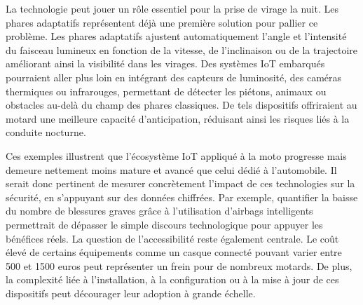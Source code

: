\vspace{0.5cm}
La technologie peut jouer un rôle essentiel pour la prise de virage la nuit. Les phares adaptatifs représentent déjà une première solution pour pallier ce problème. Les phares adaptatifs ajustent automatiquement l’angle et l’intensité du faisceau lumineux en fonction de la vitesse, de l’inclinaison ou de la trajectoire améliorant ainsi la visibilité dans les virages. Des systèmes IoT embarqués pourraient aller plus loin en intégrant des capteurs de luminosité, des caméras thermiques ou infrarouges, permettant de détecter les piétons, animaux ou obstacles au-delà du champ des phares classiques. De tels dispositifs offriraient au motard une meilleure capacité d’anticipation, réduisant ainsi les risques liés à la conduite nocturne.
\vspace{0.5cm}

Ces exemples illustrent que l’écosystème IoT appliqué à la moto progresse mais demeure nettement moins mature et avancé que celui dédié à l’automobile. Il serait donc pertinent de mesurer concrètement l’impact de ces technologies sur la sécurité, en s’appuyant sur des données chiffrées. Par exemple, quantifier la baisse du nombre de blessures graves grâce à l’utilisation d’airbags intelligents permettrait de dépasser le simple discours technologique pour appuyer les bénéfices réels.
La question de l’accessibilité reste également centrale. Le coût élevé de certains équipements comme un casque connecté pouvant varier entre 500 et 1500 euros peut représenter un frein pour de nombreux motards. De plus, la complexité liée à l’installation, à la configuration ou à la mise à jour de ces dispositifs peut décourager leur adoption à grande échelle.

